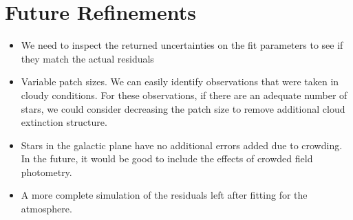 \documentclass[12pt,preprint]{aastex}
\begin{document}
\section{Future Refinements}
\begin{itemize}
\item{We need to inspect the returned uncertainties on the fit parameters to see if they match the actual residuals}
\item{Variable patch sizes.  We can easily identify observations that were taken in cloudy conditions.  For these observations, if there are an adequate number of stars, we could consider decreasing the patch size to remove additional cloud extinction structure.}
\item{Stars in the galactic plane have no additional errors added due to crowding.  In the future, it would be good to include the effects of crowded field photometry.  }
\item{A more complete simulation of the residuals left after fitting for the atmosphere.}
\end{itemize}



\end{document}
